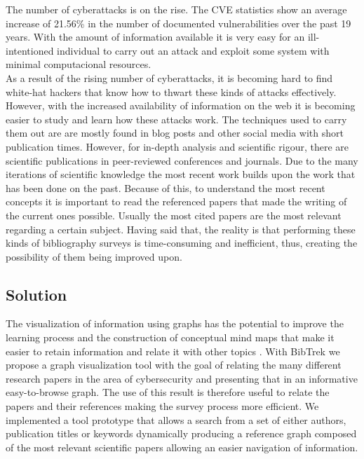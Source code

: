 \documentclass[twocolumn]{article}
\begin{document}
The number of cyberattacks is on the rise. The CVE statistics \cite{cvestatisticsbyyear} show an average increase of 21.56\% in the number of documented vulnerabilities over the past 19 years. With the amount of information available it is very easy for an ill-intentioned individual to carry out an attack and exploit some system with minimal computacional resources. 
\\[1\baselineskip]
As a result of the rising number of cyberattacks, it is becoming hard to find white-hat hackers that know how to thwart these kinds of attacks effectively. However, with the increased availability of information on the web it is becoming easier to study and learn how these attacks work. The techniques used to carry them out are are mostly found in blog posts and other social media with short publication times. However, for in-depth analysis and scientific rigour, there are scientific publications in peer-reviewed conferences and journals. Due to the many iterations of scientific knowledge the most recent work builds upon the work that has been done on the past. Because of this, to understand the most recent concepts it is important to read the referenced papers that made the writing of the current ones possible. Usually the most cited papers are the most relevant regarding a certain subject. Having said that, the reality is that performing these kinds of bibliography surveys is time-consuming and inefficient, thus, creating the possibility of them being improved upon.

\subsection{Solution}
The visualization of information using graphs has the potential to improve the learning process and the construction of conceptual mind maps that make it easier to retain information and relate it with other topics \cite{enhancinglearningwithvisualizationtechniques}. With BibTrek we propose a graph visualization tool with the goal of relating the many different research papers in the area of cybersecurity and presenting that in an informative easy-to-browse graph. The use of this result is therefore useful to relate the papers and their references making the survey process more efficient. We implemented a tool prototype that allows a search from a set of either authors, publication titles or keywords dynamically producing a reference graph composed of the most relevant scientific papers allowing an easier navigation of information. 
\end{document}
